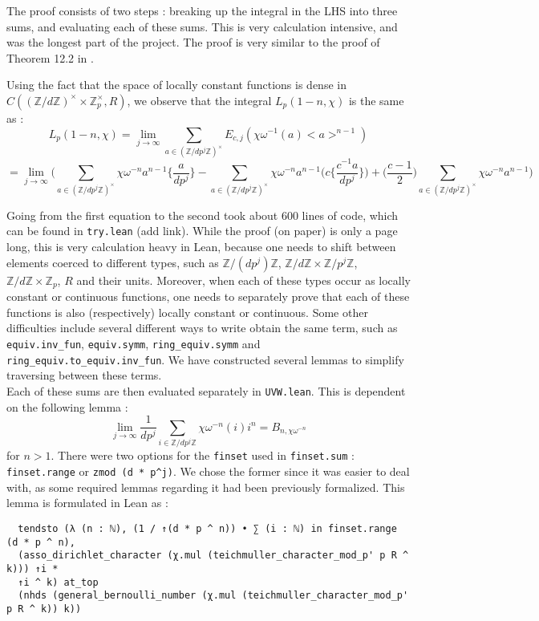 \documentclass[11pt]{article}
\newcommand{\lean}[1]{\texttt{#1}\xspace} %
\begin{document}
The proof consists of two steps : breaking up the integral in the LHS into three sums, 
and evaluating each of these sums. This is very calculation intensive, and was the longest part of the project. 
The proof is very similar to the proof of Theorem 12.2 in \cite{cyc}. 

Using the fact that the space of locally constant functions is dense in $C((\mathbb{Z}/d \mathbb{Z})^{\times} \times \mathbb{Z}_p^{\times}, R)$, 
we observe that the integral $L_p (1 - n, \chi)$ is the same as :
$$ L_p (1 - n, \chi) = \lim_{j \to \infty} \sum_{a \in (\mathbb{Z}/ d p^j \mathbb{Z})^{\times}} E_{c, j} (\chi \omega^{-1} (a) <a>^{n - 1}) \label{eqn:1} $$
$$ = \lim_{j \to \infty} \bigg ( \sum_{a \in (\mathbb{Z}/ d p^j \mathbb{Z})^{\times}} \chi \omega^{-n} a^{n - 1} \bigg \{ \frac{a}{d p^j} \bigg \} - 
  \sum_{a \in (\mathbb{Z}/ d p^j \mathbb{Z})^{\times}} \chi \omega^{-n} a^{n - 1} \bigg ( c \bigg \{ \frac{c^{-1} a}{d p^j} \bigg \} \bigg ) 
  + \bigg ( \frac{c - 1}{2} \bigg ) \sum_{a \in (\mathbb{Z}/ d p^j \mathbb{Z})^{\times}} \chi \omega^{-n} a^{n - 1} \bigg ) $$

Going from the first equation to the second took about 600 lines of code, which can be found in \lean{try.lean} (add link). While the proof (on paper) is only a page long, 
this is very calculation heavy in Lean, because one needs to shift between elements coerced to different types, such as $\mathbb{Z}/ (d p^j) \mathbb{Z}$, 
$\mathbb{Z}/ d \mathbb{Z} \times \mathbb{Z}/ p^j \mathbb{Z}$, $\mathbb{Z}/ d \mathbb{Z} \times \mathbb{Z}_p$, $R$ and their units. Moreover, when each of these types occur 
as locally constant or continuous functions, one needs to separately prove that each of these functions 
is also (respectively) locally constant or continuous. Some other difficulties include several different ways to write obtain the same term, such as \lean{equiv.inv\_fun}, 
\lean{equiv.symm}, \lean{ring\_equiv.symm} and \lean{ring\_equiv.to\_equiv.inv\_fun}. We have constructed several lemmas to simplify traversing between these terms. \\

Each of these sums are then evaluated separately in \lean{UVW.lean}. This is dependent on the following lemma : 
$$ \lim_{j \to \infty} \frac{1}{d p^j} \sum_{i \in \mathbb{Z}/ d p^j \mathbb{Z}} \chi \omega^{-n} (i) i^n = B_{n, \chi \omega^{-n}} $$ 
for $n > 1$. There were two options for the \lean{finset} used in \lean{finset.sum} : \lean{finset.range} or \lean{zmod (d * p\textasciicircum j)}. 
We chose the former since it was easier to deal with, as some required lemmas regarding it had been previously formalized. This lemma is 
formulated in Lean as :
\begin{lstlisting}
  tendsto (λ (n : ℕ), (1 / ↑(d * p ^ n)) • ∑ (i : ℕ) in finset.range (d * p ^ n),
  (asso_dirichlet_character (χ.mul (teichmuller_character_mod_p' p R ^ k))) ↑i * 
  ↑i ^ k) at_top
  (nhds (general_bernoulli_number (χ.mul (teichmuller_character_mod_p' p R ^ k)) k))
\end{lstlisting}
\end{document}
